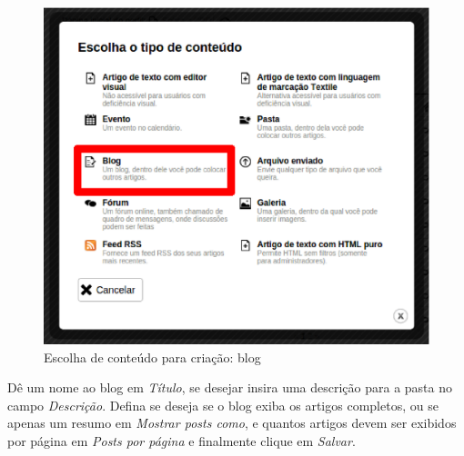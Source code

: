 \begin{figure}[H]
  \centering
    \includegraphics[keepaspectratio=true,scale=0.49]{figuras/selecionarBlog.eps}
  \caption{Escolha de conteúdo para criação: blog}
  \label{fig:selecionarBlog}
\end{figure}

\newpage
Dê um nome ao blog em \emph{Título}, se desejar insira uma descrição para a pasta no campo \emph{Descrição}. Defina se deseja se o blog exiba os artigos completos, ou se apenas um resumo em \emph{Mostrar posts como}, e quantos artigos devem ser exibidos por página em \emph{Posts por página} e finalmente clique em \emph{\color{red}Salvar}.

